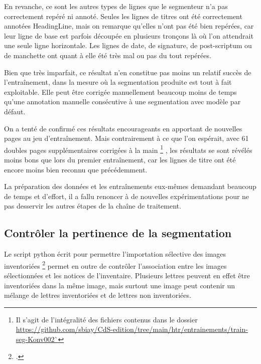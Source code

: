 \documentclass[a4paper,12pt,twoside]{book}
\begin{document}
    			En revanche, ce sont les autres types de lignes que le segmenteur n'a pas correctement repéré ni annoté. Seules les lignes de titres ont été correctement annotées \textsf{HeadingLine}, mais on remarque qu'elles n'ont pas été bien repérées, car leur ligne de base est parfois découpée en plusieurs tronçons là où l'on attendrait une seule ligne horizontale. Les lignes de date, de signature, de post-scriptum ou de manchette ont quant à elle été très mal ou pas du tout repérées.
    			
    			Bien que très imparfait, ce résultat n'en constitue pas moins un relatif succès de l'entraînement, dans la mesure où la \gls{segmentation} produite est tout à fait exploitable. Elle peut être corrigée manuellement beaucoup moins de temps qu'une annotation manuelle consécutive à une \gls{segmentation} avec modèle par défaut.
    			
    			On a tenté de confirmé ces résultats encourageants en apportant de nouvelles pages au jeu d'entraînement. Mais contrairement à ce que l'on espérait, avec 61 doubles pages supplémentaires corrigées à la main
    			\footnote{Il s'agit de l'intégralité des fichiers contenus dans le dossier \url{https://github.com/sbiay/CdS-edition/tree/main/htr/entrainements/train-seg-Konv002`}}
    			, les résultats se sont révélés moins bons que lors du premier entraînement, car les lignes de titre ont été encore moins bien reconnu que précédemment. 
    			
    			La préparation des données et les entraînements eux-mêmes demandant beaucoup de temps et d'effort, il a fallu renoncer à de nouvelles expérimentations pour ne pas desservir les autres étapes de la chaîne de traitement.

	    		
	    	\subsection{Contrôler la pertinence de la \gls{segmentation}}
		    	\label{controle-segmentation-lettres-inventoriees}
	    		
	    		Le script python écrit pour permettre l'importation sélective des images inventoriées \footcite{biayDonneesImagesPy2022} permet en outre de contrôler l'association entre les images sélectionnées et les notices de l'inventaire. Plusieurs lettres peuvent en effet être inventoriées dans la même image, mais surtout une image peut contenir un mélange de lettres inventoriées et de lettres non inventoriées.
	    		
\end{document}
